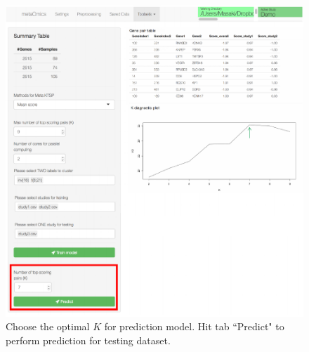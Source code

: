 \begin{figure}[H]
\begin{center}
\includegraphics[scale=0.7]{./figure/MetaKTSP/Figure11.pdf}
\caption{Choose the optimal $K$ for prediction model. Hit tab ``Predict" to perform prediction for testing dataset.}
\label{fig:Predict}
\end{center}
\end{figure}

